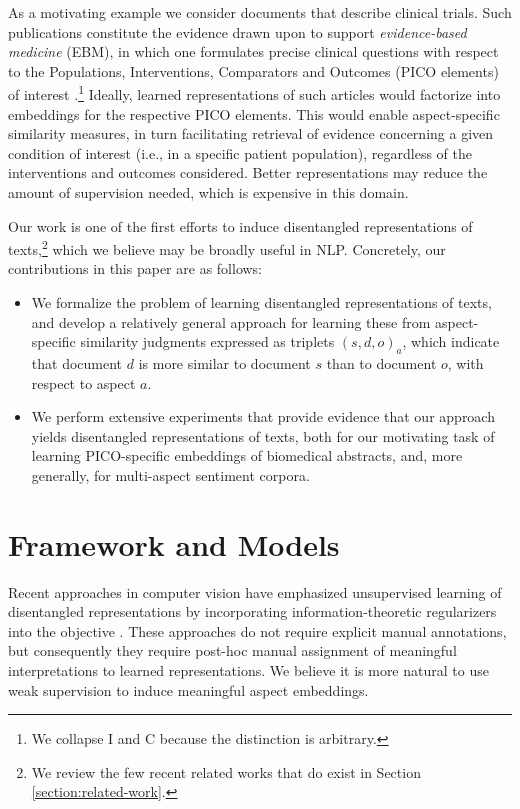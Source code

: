 \documentclass[11pt,a4paper]{article}
\begin{document}
As a motivating example we consider documents that describe clinical trials. Such publications constitute the evidence drawn upon to support \emph{evidence-based medicine} (EBM), in which one formulates precise clinical questions with respect to the Populations, Interventions, Comparators and Outcomes (PICO elements) of interest \cite{sackett1996evidence}.\footnote{We collapse I and C because the distinction is arbitrary.} Ideally, learned representations of such articles would factorize into embeddings for the respective PICO elements. This would enable aspect-specific similarity measures, in turn facilitating retrieval of evidence concerning a given condition of interest (i.e., in a specific patient population), regardless of the interventions and outcomes considered. Better representations may reduce the amount of supervision needed, which is expensive in this domain.

Our work is one of the first efforts to induce disentangled representations of texts,\footnote{We review the few recent related works that do exist in Section \ref{section:related-work}.} which we believe may be broadly useful in NLP. Concretely, our contributions in this paper are as follows:

\vspace{-.4em}
\begin{itemize}[leftmargin=1.0em]
\item We formalize the problem of learning disentangled representations of texts, and develop a relatively general approach for learning these from aspect-specific similarity judgments expressed as triplets $(s, d, o)_a$, which indicate that document $d$ is more similar to document $s$ than to document $o$, with respect to aspect $a$.
\vspace{-.5em}
\item We perform extensive experiments that provide evidence that our approach yields disentangled representations of texts, both for our motivating task of learning PICO-specific embeddings of biomedical abstracts, and, more generally, for multi-aspect sentiment corpora.
\end{itemize}

\vspace{-.65em}
\section{Framework and Models}
\vspace{-.5em}
Recent approaches in computer vision have emphasized unsupervised learning of disentangled representations by incorporating information-theoretic regularizers into the objective \cite{chen2016infogan,higgins2017beta-vae}. These approaches do not require explicit manual annotations, but consequently they require post-hoc manual assignment of meaningful interpretations to learned representations. We believe it is more natural to use weak supervision to induce meaningful aspect embeddings.
\end{document}
